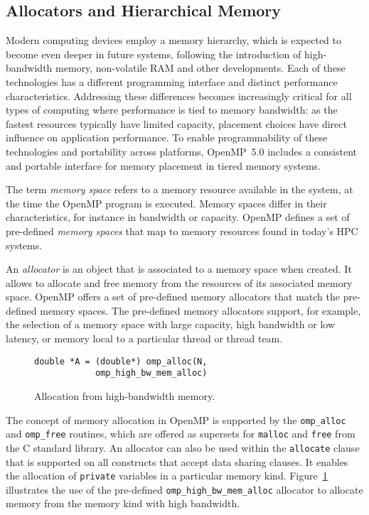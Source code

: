 \subsection{Allocators and Hierarchical Memory}
\label{sub:allocators_and_hierarchical_memory}

Modern computing devices employ a memory hierarchy, which is expected to become
even deeper in future systems, following the introduction of high-bandwidth
memory, non-volatile RAM and other developments.
Each of these technologies has a different programming interface and distinct
performance characteristics.
Addressing these differences becomes increasingly critical for all types of
computing where performance is tied to memory bandwidth: as the fastest
resources typically have limited capacity, placement choices have direct
influence on application performance.
To enable programmability of these technologies and portability across
platforms, OpenMP~5.0 includes a consistent and portable interface for memory
placement in tiered memory systems.

The term \emph{memory space} refers to a memory resource available in the
system, at the time the OpenMP program is executed. Memory spaces differ in their characteristics, for instance in bandwidth or
capacity. OpenMP defines a set of pre-defined \emph{memory spaces} that map to memory resources found in today's HPC systems.

An \emph{allocator} is an object that is associated to a memory space when created. It allows to allocate and free memory from the resources of its associated memory space. OpenMP offers a set of pre-defined memory allocators that match the pre-defined memory spaces. The pre-defined memory allocators support, for example, the selection of a memory space with large capacity, high bandwidth or low latency, or memory local to a particular thread or thread team.

\begin{figure}
\begin{verbatim}
double *A = (double*) omp_alloc(N,
            omp_high_bw_mem_alloc)
\end{verbatim}
\caption{Allocation from high-bandwidth memory.\label{fig:allocators}}
\end{figure}

The concept of memory allocation in OpenMP is supported by the
\texttt{omp\_alloc} and \texttt{omp\_free} routines, which are offered as supersets for \texttt{malloc} and \texttt{free} from the C standard library.
An allocator can also be used within the \texttt{allocate} clause that is
supported on all constructs that accept data sharing clauses.
It enables the allocation of \texttt{private} variables in a particular memory
kind.
Figure~\ref{fig:allocators} illustrates the use of the pre-defined
\texttt{omp\_high\_bw\_mem\_alloc} allocator to allocate memory from the memory
kind with high bandwidth.


